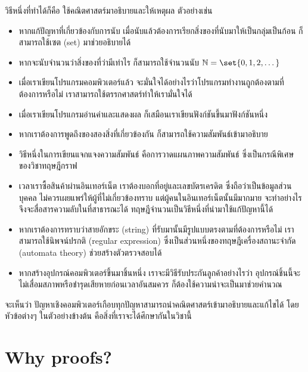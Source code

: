 วิธีหนึ่งที่ทำได้ก็คือ ใช้คณิตศาสตร์มาอธิบายและให้เหตุผล ตัวอย่างเช่น
\begin{itemize}
\item หากแก้ปัญหาที่เกี่ยวข้องกับการนับ เมื่อนับแล้วต้องการเรียกสิ่งของที่นับมาให้เป็นกลุ่มเป็นก้อน ก็สามารถใช้เซต (set) มาช่วยอธิบายได้

\item หากจะนับจำนวนว่าสิ่งของที่ว่ามีเท่าไร ก็สามารถใช้จำนวนนับ $\mathbb{N}=\set{0, 1, 2, \dots}$

\item เมื่อเราเขียนโปรแกรมคอมพิวเตอร์แล้ว จะมั่นใจได้อย่างไรว่าโปรแกรมทำงานถูกต้องตามที่ต้องการหรือไม่ เราสามารถใช้ตรรกศาสตร์ทำให้เรามั่นใจได้

\item เมื่อเราเขียนโปรแกรมอ่านค่าและแสดงผล ก็เสมือนเราเขียนฟังก์ชันขึ้นมาฟังก์ชันหนึ่ง

\item หากเราต้องการพูดถึงของสองสิ่งที่เกี่ยวข้องกัน ก็สามารถใช้ความสัมพันธ์เข้ามาอธิบาย

\item วิธีหนึ่งในการเขียนแจกแจงความสัมพันธ์ คือการวาดแผนภาพความสัมพันธ์ ซึ่งเป็นกรณีพิเศษของวิชาทฤษฎีกราฟ

\item เวลาเราซื้อสินค้าผ่านอินเทอร์เน็ต เราต้องบอกที่อยู่และเลขบัตรเครดิต ซึ่งถือว่าเป็นข้อมูลส่วนบุคคล ไม่ควรเผยแพร่ให้ผู้ที่ไม่เกี่ยวข้องทราบ แต่ผู้คนในอินเทอร์เน็ตนั้นมีมากมาย จะทำอย่างไรจึงจะสื่อสารความลับในที่สาธารณะได้ ทฤษฎีจำนวนเป็นวิธีหนึ่งที่นำมาใช้แก้ปัญหานี้ได้

\item หากเราต้องการทราบว่าสายอักขระ (string) ที่รับมานั้นมีรูปแบบตรงตามที่ต้องการหรือไม่ เราสามารถใช้นิพจน์ปรกติ (regular expression) ซึ่งเป็นส่วนหนึ่งของทฤษฎีเครื่องสถานะจำกัด (automata theory) ช่วยสร้างตัวตรวจสอบได้

\item หากสร้างอุปกรณ์คอมพิวเตอร์ขึ้นมาชิ้นหนึ่ง เราจะมีวิธีรับประกันลูกค้าอย่างไรว่า อุปกรณ์ชิ้นนี้จะไม่เสื่อมสภาพหรือชำรุดเสียหายก่อนเวลาอันสมควร ก็ต้องใช้ความน่าจะเป็นมาช่วยคำนวณ
\end{itemize}
จะเห็นว่า ปัญหาเชิงคอมพิวเตอร์เกือบทุกปัญหาสามารถนำคณิตศาสตร์เข้ามาอธิบายและแก้ไขได้ โดยหัวข้อต่างๆ ในตัวอย่างข้างต้น คือสิ่งที่เราจะได้ศึกษากันในวิชานี้

\section{Why proofs?}

